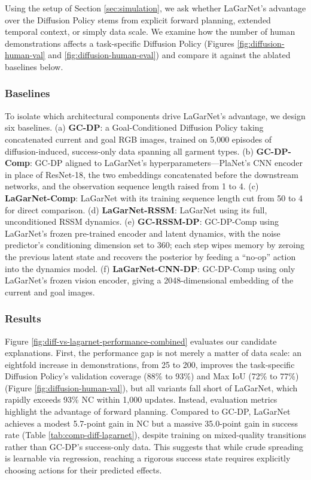 \documentclass[journal]{IEEEtran}
\newif\ifshowrev\showrevtrue
\newcommand{\rev}[1]{\ifshowrev\textcolor{revblue}{#1}\else#1\fi}
\begin{document}
\rev{Using the setup of Section \ref{sec:simulation}, we ask whether LaGarNet's advantage over the Diffusion Policy stems from explicit forward planning, extended temporal context, or simply data scale. We examine how the number of human demonstrations affects a task-specific Diffusion Policy (Figures \ref{fig:diffusion-human-val} and \ref{fig:diffusion-human-eval}) and compare it against the ablated baselines below.}


\subsubsection{Baselines} \label{sec:diff-baselines}

\rev{To isolate which architectural components drive LaGarNet's advantage, we design six baselines. (a) \textbf{GC-DP}: a Goal-Conditioned Diffusion Policy taking concatenated current and goal RGB images, trained on 5,000 episodes of diffusion-induced, success-only data spanning all garment types. (b) \textbf{GC-DP-Comp}: GC-DP aligned to LaGarNet's hyperparameters---PlaNet's CNN encoder in place of ResNet-18, the two embeddings concatenated before the downstream networks, and the observation sequence length raised from 1 to 4. (c) \textbf{LaGarNet-Comp}: LaGarNet with its training sequence length cut from 50 to 4 for direct comparison. (d) \textbf{LaGarNet-RSSM}: LaGarNet using its full, unconditioned RSSM dynamics. (e) \textbf{GC-RSSM-DP}: GC-DP-Comp using LaGarNet's frozen pre-trained encoder and latent dynamics, with the noise predictor's conditioning dimension set to 360; each step wipes memory by zeroing the previous latent state and recovers the posterior by feeding a ``no-op'' action into the dynamics model. (f) \textbf{LaGarNet-CNN-DP}: GC-DP-Comp using only LaGarNet's frozen vision encoder, giving a 2048-dimensional embedding of the current and goal images.}



\subsubsection{Results} \label{sec:diff-result}

\rev{Figure \ref{fig:diff-vs-lagarnet-performance-combined} evaluates our candidate explanations. First, the performance gap is not merely a matter of data scale: an eightfold increase in demonstrations, from 25 to 200, improves the task-specific Diffusion Policy's validation coverage (88\% to 93\%) and Max IoU (72\% to 77\%) (Figure \ref{fig:diffusion-human-val}), but all variants fall short of LaGarNet, which rapidly exceeds 93\% NC within 1,000 updates. Instead, evaluation metrics highlight the advantage of forward planning. Compared to GC-DP, LaGarNet achieves a modest 5.7-point gain in NC but a massive 35.0-point gain in success rate (Table \ref{tab:comp-diff-lagarnet}), despite training on mixed-quality transitions rather than GC-DP's success-only data. This suggests that while crude spreading is learnable via regression, reaching a rigorous success state requires explicitly choosing actions for their predicted effects.}
\end{document}
